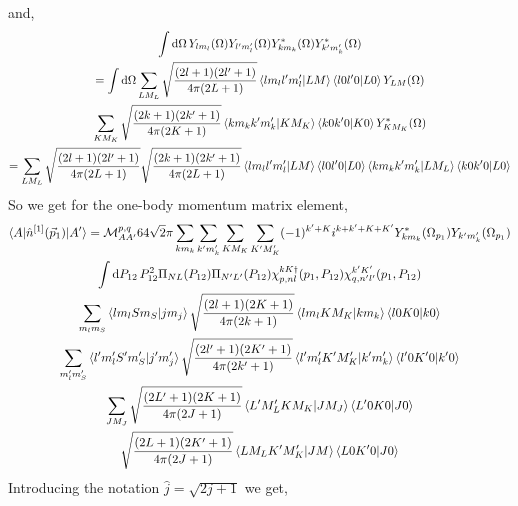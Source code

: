 \documentclass[10pt]{article}
\begin{document}
and,
\begin{multline*}
	\int \text{d} \Omega \, Y_{ l m_l }(\Omega) Y_{ l' m_l'}(\Omega) Y_{ k m_k}^{*}(\Omega) Y_{ k' m_k'}^{*}(\Omega) \\
	= \int \text{d} \Omega \sum_{LM_L} \sqrt{ \frac{(2l+1)(2l'+1)}{4 \pi (2L+1)}} \braket{ l m_l l' m_l' | L M} \braket{ l 0 l' 0 | L 0 } Y_{L M}(\Omega) \\
	 \sum_{K M_K} \sqrt{ \frac{(2k+1)(2k'+1)}{4 \pi (2K+1)}} \braket{ k m_k k' m_k' | K M_K} \braket{ k 0 k' 0 | K 0 } Y_{K M_K}^{*}(\Omega) \\
	 = \sum_{LM_L} \sqrt{ \frac{(2l+1)(2l'+1)}{4 \pi (2L+1)}} \sqrt{ \frac{(2k+1)(2k'+1)}{4 \pi (2L+1)}} \braket{ l m_l l' m_l' | L M} \braket{ l 0 l' 0 | L 0 } \braket{ k m_k k' m_k' | L M_L} \braket{ k 0 k' 0 | L 0 } 
\end{multline*}
So we get for the one-body momentum matrix element,
\begin{multline*}
\braket{ A | \hat{n}^{[1]}(\vec{p}_1) | A'} = \mathcal{M}_{A A'}^{p,q} 64 \sqrt{2} \pi \sum_{k m_k} \sum_{k' m_k'} \sum_{K M_K} \sum_{K' M_K'} (-1)^{k'+K} i^{k+k'+K+K'} Y_{k m_k}^{*}(\Omega_{p_1}) Y_{k' m_k'}(\Omega_{p_1}) \\
 \int \text{d} P_{12} \, P_{12}^{2} \Pi_{N L}(P_{12}) \Pi_{N' L'}(P_{12}) \chi_{p,nl}^{kK\dagger}(p_1,P_{12}) \chi_{q,n'l'}^{k'K'}(p_1,P_{12}) \\
 \sum_{m_l m_S} \braket{l m_l S m_S | j m_j} \sqrt{ \frac{ (2l+1)(2K+1)}{ 4 \pi (2k+1)} } \braket{ l m_l K M_K | k m_k } \braket{ l 0 K 0 | k 0}  \\
  \sum_{m_l' m_S'} \braket{l' m_l' S' m_S' | j' m_j'} \sqrt{ \frac{ (2l'+1)(2K'+1)}{ 4 \pi (2k'+1)} } \braket{ l' m_l' K' M_K' | k' m_k' } \braket{ l' 0 K' 0 | k' 0}  \\
   \sum_{J M_J} \sqrt{ \frac{ (2L'+1)(2K+1)}{ 4 \pi ( 2 J + 1 )}} \braket{ L' M_L' K M_K | J M_J} \braket{ L' 0 K 0 | J 0 } \\
    \sqrt{ \frac{ (2L + 1)(2 K'+1) }{4 \pi (2 J+1)}} \braket{ L M_L K' M_K' | J M} \braket{ L 0 K' 0 | J 0} \\
\end{multline*}
Introducing the notation $\hat{j} = \sqrt{2 j + 1}$ we get,
\end{document}
